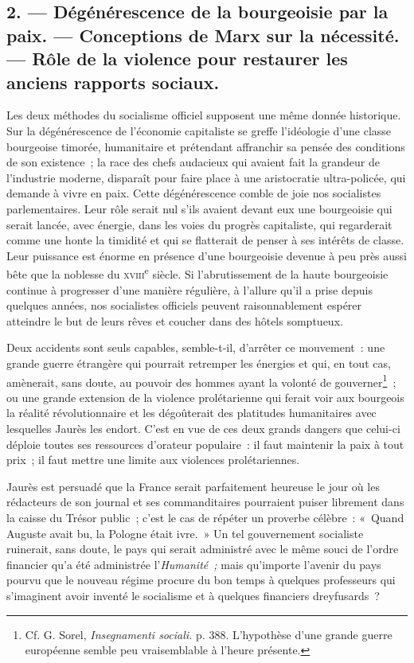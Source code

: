 \documentclass[french,twoside]{book} %
\begin{document}
\subsection[{2. — Dégénérescence de la bourgeoisie par la paix. — Conceptions de Marx sur la nécessité. — Rôle de la violence pour restaurer les anciens rapports sociaux.}]{2. — Dégénérescence de la bourgeoisie par la paix. — Conceptions de Marx sur la nécessité. — Rôle de la violence pour restaurer les anciens rapports sociaux.}
\label{p08}
\noindent Les deux méthodes du socialisme officiel supposent une même donnée historique. Sur la dégénérescence de l’économie capitaliste se greffe l’idéologie d’une classe bourgeoise timorée, humanitaire et prétendant affranchir sa pensée des conditions de son existence ; la race des chefs audacieux qui avaient fait la grandeur de l’industrie moderne, disparaît pour faire place à une aristocratie ultra-policée, qui demande à vivre en paix. Cette dégénérescence  comble de joie nos socialistes parlementaires. Leur rôle serait nul s’ils avaient devant eux une bourgeoisie qui serait lancée, avec énergie, dans les voies du progrès capitaliste, qui regarderait comme une honte la timidité et qui se flatterait de penser à ses intérêts de classe. Leur puissance est énorme en présence d’une bourgeoisie devenue à peu près aussi bête que la noblesse du {\scshape xviii}\textsuperscript{e} siècle. Si l’abrutissement de la haute bourgeoisie continue à progresser d’une manière régulière, à l’allure qu’il a prise depuis quelques années, nos socialistes officiels peuvent raisonnablement espérer atteindre le but de leurs rêves et coucher dans des hôtels somptueux.\par
Deux accidents sont seuls capables, semble-t-il, d’arrêter ce mouvement : une grande guerre étrangère qui pourrait retremper les énergies et qui, en tout cas, amènerait, sans doute, au pouvoir des hommes ayant la volonté de gouverner\footnote{ \noindent Cf. G. Sorel, \emph{Insegnamenti sociali.} p. 388. L’hypothèse d’une grande guerre européenne semble peu vraisemblable à l’heure présente.
 } ; ou une grande extension de la violence prolétarienne qui ferait voir aux bourgeois la réalité révolutionnaire et les dégoûterait des platitudes humanitaires avec lesquelles Jaurès les endort. C’est en vue de ces deux grands dangers que celui-ci déploie toutes ses ressources d’orateur populaire : il faut maintenir la paix à tout prix ; il faut mettre une limite aux violences prolétariennes.\par
Jaurès est persuadé que la France serait parfaitement heureuse le jour où les rédacteurs de son journal et ses commanditaires pourraient puiser librement dans la  caisse du Trésor public ; c’est le cas de répéter un proverbe célèbre : « Quand Auguste avait bu, la Pologne était ivre. » Un tel gouvernement socialiste ruinerait, sans doute, le pays qui serait administré avec le même souci de l’ordre financier qu’a été administrée l’\emph{Humanité ;} mais qu’importe l’avenir du pays pourvu que le nouveau régime procure du bon temps à quelques professeurs qui s’imaginent avoir inventé le socialisme et à quelques financiers dreyfusards ?\par
\end{document}
